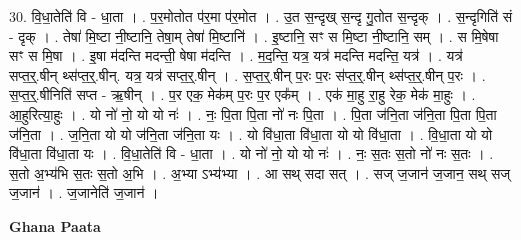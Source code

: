\documentclass[17pt]{extarticle}
\begin{document}
30. वि॒धा॒तेति॑ वि - धा॒ता । . प॒र॒मोतोत प॑र॒मा प॑र॒मोत । . उ॒त स॒न्दृख् स॒न्दृ गु॒तोत स॒न्दृक् । . स॒न्दृगिति॑ सं - दृक् । . तेषा॑ मि॒ष्टा नी॒ष्टानि॒ तेषा॒म् तेषा॑ मि॒ष्टानि॑ । . इ॒ष्टानि॒ सꣳ स मि॒ष्टा नी॒ष्टानि॒ सम् । . स मि॒षेषा सꣳ स मि॒षा । . इ॒षा म॑दन्ति मदन्ती॒ षेषा म॑दन्ति । . म॒द॒न्ति॒ यत्र॒ यत्र॑ मदन्ति मदन्ति॒ यत्र॑ । . यत्र॑ सप्त॒र्॒.षीन् थ्स॑प्त॒र्॒.षीन्. यत्र॒ यत्र॑ सप्त॒र्॒.षीन् । . स॒प्त॒र्॒.षीन् प॒रः प॒रः स॑प्त॒र्॒.षीन् थ्स॑प्त॒र्॒.षीन् प॒रः । . स॒प्त॒र्॒.षीनिति॑ सप्त - ऋ॒षीन् । . प॒र एक॒ मेक॑म् प॒रः प॒र एक᳚म् । . एक॑ मा॒हु रा॒हु रेक॒ मेक॑ मा॒हुः । . आ॒हुरित्या॒हुः । . यो नो॑ नो॒ यो यो नः॑ । . नः॒ पि॒ता पि॒ता नो॑ नः पि॒ता । . पि॒ता ज॑नि॒ता ज॑नि॒ता पि॒ता पि॒ता ज॑नि॒ता । . ज॒नि॒ता यो यो ज॑नि॒ता ज॑नि॒ता यः । . यो वि॑धा॒ता वि॑धा॒ता यो यो वि॑धा॒ता । . वि॒धा॒ता यो यो वि॑धा॒ता वि॑धा॒ता यः । . वि॒धा॒तेति॑ वि - धा॒ता । . यो नो॑ नो॒ यो यो नः॑ । . नः॒ स॒तः स॒तो नो॑ नः स॒तः । . स॒तो अ॒भ्य॑भि स॒तः स॒तो अ॒भि । . अ॒भ्या ऽभ्य॑भ्या । . आ सथ् सदा सत् । . सज् ज॒जान॑ ज॒जान॒ सथ् सज् ज॒जान॑ । . ज॒जानेति॑ ज॒जान॑ । \newline

\textbf{Ghana Paata } \newline
\end{document}
